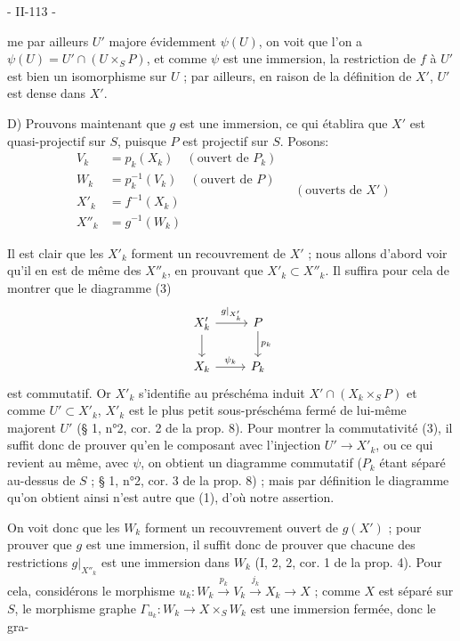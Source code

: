 
- II-113 -

me par ailleurs $U'$ majore évidemment $\psi(U)$, on voit que l'on a $\psi(U) = U' \cap (U \times_S P)$, et comme $\psi$ est une immersion, la restriction de $f$ à $U'$ est bien un isomorphisme sur $U$ ; par ailleurs, en raison de la définition de $X'$, $U'$ est dense dans $X'$.

D) Prouvons maintenant que $g$ est une immersion, ce qui établira que $X'$ est quasi-projectif sur $S$, puisque $P$ est projectif sur $S$. Posons:
$$
\begin{aligned}
V_k &= p_k(X_k) \quad (\text{ouvert de } P_k) \\
W_k &= p_k^{-1}(V_k) \quad (\text{ouvert de } P) \\
X'_k &= f^{-1}(X_k) \\
X''_k &= g^{-1}(W_k)
\end{aligned} \quad (\text{ouverts de } X')
$$

Il est clair que les $X'_k$ forment un recouvrement de $X'$ ; nous allons d'abord voir qu'il en est de même des $X''_k$, en prouvant que $X'_k \subset X''_k$.
Il suffira pour cela de montrer que le diagramme
(3)
$$
\begin{tikzcd}
X'_k \arrow[r, "g|_{X'_k}"] \arrow[d] & P \arrow[d, "p_k"] \\
X_k \arrow[r, "\psi_k"] & P_k
\end{tikzcd}
$$
est commutatif. Or $X'_k$ s'identifie au préschéma induit $X' \cap (X_k \times_S P)$ et comme $U' \subset X'_k$, $X'_k$ est le plus petit sous-préschéma fermé de lui-même majorent $U'$ (§ 1, n°2, cor. 2 de la prop. 8). Pour montrer la commutativité (3), il suffit donc de prouver qu'en le composant avec l'injection $U' \to X'_k$, ou ce qui revient au même, avec $\psi$, on obtient un diagramme commutatif ($P_k$ étant séparé au-dessus de $S$ ; § 1, n°2, cor. 3 de la prop. 8) ; mais par définition le diagramme qu'on obtient ainsi n'est autre que (1), d'où notre assertion.

On voit donc que les $W_k$ forment un recouvrement ouvert de $g(X')$ ; pour prouver que $g$ est une immersion, il suffit donc de prouver que chacune des restrictions $g|_{X''_k}$ est une immersion dans $W_k$ (I, 2, 2, cor. 1 de la prop. 4). Pour cela, considérons le morphisme $u_k : W_k \xrightarrow{p_k} V_k \xrightarrow{j_k} X_k \to X$ ; comme $X$ est séparé sur $S$, le morphisme graphe $\Gamma_{u_k} : W_k \to X \times_S W_k$ est une immersion fermée, donc le gra-

